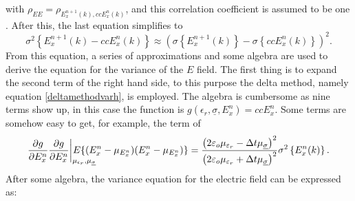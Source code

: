 \documentclass[12pt, oneside]{book}
\begin{document}
with $\rho_{E E}=\rho_{E_x^{n+1}(k),cc E_x^{n}(k)}$, and this correlation coefficient is assumed to be one \cite{smith2011stochastic}. After this, the last equation simplifies to 
\begin{equation}
\sigma^{2}\left\{E_{x}^{n+1}(k)-c c E_{x}^{n}(k)\right\} \approx \left(\sigma\left\{E_{x}^{n+1}(k)\right\}- \sigma\left\{c c E_{x}^{n}(k)\right\}\right)^{2}.
\end{equation}
\indent From this equation, a series of approximations and some algebra are used to derive the equation for the variance of the $E$ field. The first thing is to expand the second term of the right hand side, to this purpose the delta method, namely equation \ref{deltamethodvarh}, is employed. The algebra is cumbersome as nine terms show up, in this case the function is $g\left(\epsilon_r, \underline{\sigma}, E_x^n\right)=cc E_x^n$. Some terms are somehow easy to get, for example, the term of 
\begin{equation}
\frac{\partial g}{\partial E_x^n} \frac{\partial g}{\partial E_x^n} \bigg |_{\mathrlap{\mu_{\epsilon_r}, \mu_{\underline{\sigma}}}} E\{(E_x^n-\mu_{E_x^n})(E_x^n-\mu_{E_x^n})\}=\frac{\left(2 \varepsilon_{o} \mu_{\varepsilon_{r}}-\Delta t \mu_{\underline{\sigma}}\right)^{2}}{\left(2 \varepsilon_{o} \mu_{\varepsilon_{r}}+\Delta t \mu_{\underline{\sigma}}\right)^{2}} \sigma^{2}\left\{E_{x}^{n}(k)\right\}.
\end{equation}
After some algebra, the variance equation for the electric field can be expressed as:
\end{document}
